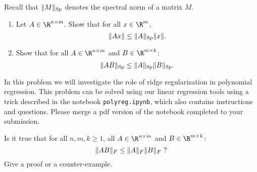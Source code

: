 \documentclass[11pt,nocut]{article}
\begin{document}
\vspace{4mm}

\begin{problem}[2 points]
	Recall that $\|M\|_{\rm Sp}$ denotes the spectral norm of a matrix $M$.
	\begin{enumerate}[label=\normalfont(\textbf{\alph*})]
		\item Let $A\in \R^{n \times m}.$ Show that for all $x \in \R^m$,
			$$
			\|Ax\| \leq \|A\|_{\rm Sp} \|x\|.
			$$
		\item Show that for all $A \in \R^{n \times m}$ and $B\in \R^{m \times k}$:
			$$
			\|AB\|_{\rm Sp} \leq \|A\|_{\rm Sp} \|B\|_{\rm Sp}.
			$$
	\end{enumerate}
\end{problem}

\vspace{4mm}

\begin{problem}[3 points]
	In this problem we will investigate the role of ridge regularization in polynomial regression. This problem can be solved using our linear regression tools using a trick described in the notebook \texttt{polyreg.ipynb}, which also contains instructions and questions. Please merge a pdf version of the notebook completed to your submission.
\end{problem}

\vspace{4mm}

\begin{problem}[$\star$]
Is it true that for all $n,m,k \geq 1$, all $A \in \R^{n \times m}$ and $B\in \R^{m \times k}$:
			$$
			\|AB\|_{F} \leq \|A\|_{F} \|B\|_{F} \ {\rm ?}
			$$
			Give a proof or a counter-example.
\end{problem}


%
%
\end{document}
